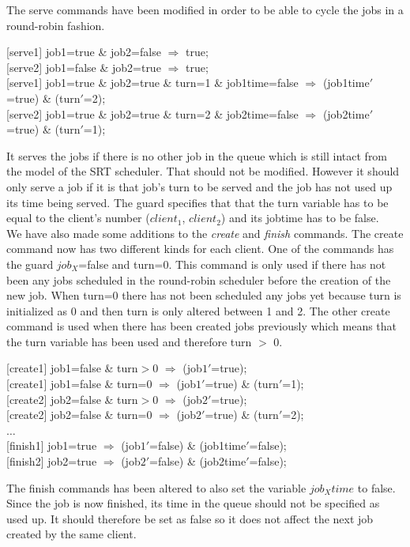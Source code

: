 \documentclass[12pt]{report}
\begin{document}
The serve commands have been modified in order to be able to cycle the jobs in a round-robin fashion.
\begin{center}
{[serve1]} job1=true \& job2=false $\Rightarrow$ true;\\
{[serve2]} job1=false \& job2=true $\Rightarrow$ true;\\
{[serve1]} job1=true \& job2=true \& turn=1 \& job1time=false $\Rightarrow$ (job1time$'$=true) \& (turn$'$=2);\\
{[serve2]} job1=true \& job2=true \& turn=2 \& job2time=false $\Rightarrow$ (job2time$'$=true) \& (turn$'$=1);
\end{center}
It serves the jobs if there is no other job in the queue which is still intact from the model of the SRT scheduler. That should not be modified. However it should only serve a job if it is that job's turn to be served and the job has not used up its time being served. The guard specifies that that the turn variable has to be equal to the client's number ($client_1$, $client_2$) and its jobtime has to be false.\\
We have also made some additions to the \emph{create} and \emph{finish} commands. The create command now has two different kinds for each client. One of the commands has the guard $job_X$=false and turn=0. This command is only used if there has not been any jobs scheduled in the round-robin scheduler before the creation of the new job. When turn=0 there has not been scheduled any jobs yet because turn is initialized as 0 and then turn is only altered between 1 and 2. The other create command is used when there has been created jobs previously which means that the turn variable has been used and therefore turn $>$ 0.
\begin{center}
{[create1]} job1=false \& turn$>$0 $\Rightarrow$ (job$1'$=true);\\
{[create1]} job1=false \& turn=0 $\Rightarrow$ (job$1'$=true) \& (turn$'$=1);\\
{[create2]} job2=false \& turn$>$0 $\Rightarrow$ (job$2'$=true);\\
{[create2]} job2=false \& turn=0 $\Rightarrow$ (job$2'$=true) \& (turn$'$=2);\\
$\dots$\\
{[finish1]} job1=true $\Rightarrow$ (job$1'$=false) \& (job1time$'$=false);\\
{[finish2]} job2=true $\Rightarrow$ (job$2'$=false) \& (job2time$'$=false);
\end{center}
The finish commands has been altered to also set the variable $job_Xtime$ to false. Since the job is now finished, its time in the queue should not be specified as used up. It should therefore be set as false so it does not affect the next job created by the same client.\\
\end{document}
